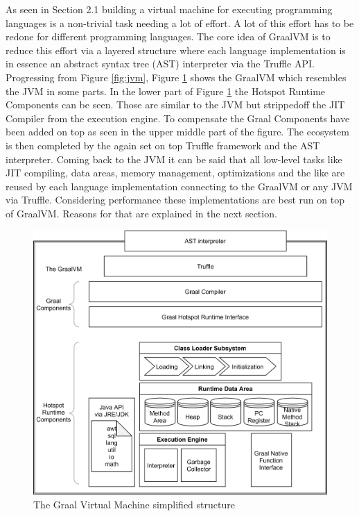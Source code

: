 As seen in Section 2.1 building a virtual machine for executing programming languages is a non-trivial task needing a lot of effort. A lot of this effort has to be redone for different programming languages. The core idea of GraalVM is to reduce this effort via a layered structure where each language implementation is in essence an abstract syntax tree (AST) interpreter via the Truffle API. Progressing from Figure \ref{fig:jvm}, Figure \ref{fig:graalvm} shows the GraalVM which resembles the JVM in some parts. In the lower part of Figure \ref{fig:graalvm} the Hotspot Runtime Components can be seen.  Those are similar to the JVM but strippedoff the JIT Compiler from the execution engine. To compensate the Graal Components have been added on top as seen in the upper middle part of the figure. The ecosystem is then completed by the again set on top Truffle framework and the AST interpreter. Coming back to the JVM it can be said that all low-level tasks like JIT compiling, data areas, memory management, optimizations and the like are reused by each language implementation connecting to the GraalVM or any JVM via Truffle. Considering performance these implementations are best run on top of GraalVM. Reasons for that are explained in the next section.

\begin{figure}[h!]
    \centering
    \includegraphics[scale=0.8]{figures/GraalVM.png}
    \caption{The Graal Virtual Machine simplified structure}
    \label{fig:graalvm}
\end{figure}

